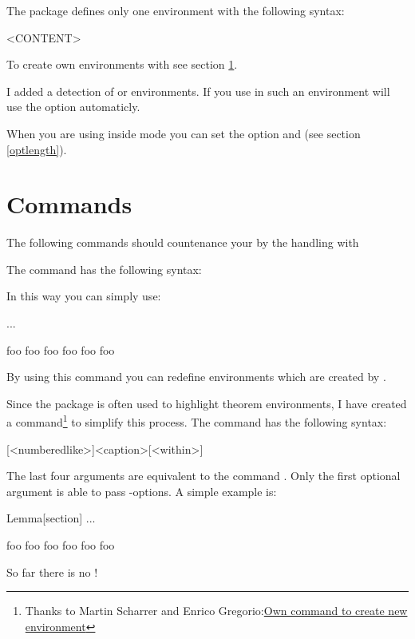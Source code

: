 \documentclass[parskip=false,english,11pt]{ltxmdf}
\begin{document}
The package defines only one environment with the following syntax:
\begin{mdexample}
 \begin{mdframed}
    <CONTENT>
 \end{mdframed}
\end{mdexample}
To create own environments with  see section \ref{sec:cmds}.

I added a detection of  or  environments. If you use \mdname in such an environment \mdname will use the option  automaticly. 

When you are using \mdname inside  mode you  can set the option 
and  (see section \ref{optlength}).

\section{Commands}\label{sec:cmds}
The following commands should countenance your by the handling with 

 The command has the following syntax:
\begin{mdexample}
\end{mdexample}
In this way you can simply use:
\begin{mdexample}
 ...
 \begin{infobox}[backgroundcolor=yellow]
  foo   foo   foo   foo   foo   foo 
 \end{infobox}
\end{mdexample}
 By using this command you can redefine environments which are created by .

Since the package is often used to highlight theorem environments, I have created a command\footnote{Thanks to Martin Scharrer and Enrico Gregorio:\newline \href{http://tex.stackexchange.com/questions/26298/own-command-to-create-new-environment}{Own command to create new environment}} to simplify this process. The command has the following syntax:

\begin{mdexample}[deletekeywords={mdframed}]
%
                [<numberedlike>]{<caption>}[<within>]
\end{mdexample}
The last four arguments are equivalent to the command . Only the first optional argument is able to pass -options. A simple example is:
\begin{mdexample}
\theoremstyle{<some style>}
%
                {Lemma}[section]
... 
\begin{lemma}
  foo   foo   foo   foo   foo   foo
\end{lemma}
\end{mdexample}
So far there is no !
\end{document}
